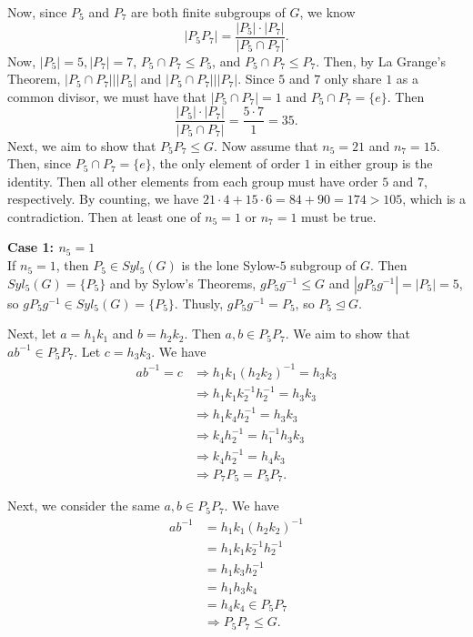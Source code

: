\documentclass{article}
\begin{document}
\begin{enumerate}
    Now, since $P_5$ and $P_7$ are both finite subgroups of $G$, we know
    \[
        |P_5P_7| = \dfrac{|P_5| \cdot |P_7|}{|P_5 \cap P_7|}.
    \]
    Now, $|P_5| = 5, |P_7|=7$, $P_5 \cap P_7 \leq P_5$, and $P_5 \cap P_7 \leq P_7$. Then, by La Grange's Theorem, $|P_5 \cap P_7| \big| |P_5|$
    and $|P_5 \cap P_7| \big| |P_7|$. Since $5$ and $7$ only share $1$ as a common divisor, we must have that $|P_5 \cap P_7| = 1$ and 
    $P_5 \cap P_7 = \{e\}$. Then 
    \[
        \dfrac{|P_5| \cdot |P_7|}{|P_5 \cap P_7|} = \dfrac{5 \cdot 7}{1} = 35.
    \]
    Next, we aim to show that $P_5P_7 \leq G$. Now assume that $n_5 = 21$ and $n_7 = 15$. Then, since $P_5 \cap P_7 = \{e\}$, the only element
    of order $1$ in either group is the identity. Then all other elements from each group must have order $5$ and $7$, respectively. By
    counting, we have $21 \cdot 4 + 15 \cdot 6 = 84 + 90 = 174 > 105$, which is a contradiction. Then at least one of $n_5 = 1$ or $n_7 = 1$
    must be true.

    \textbf{Case 1: $n_5 = 1$}\\
    If $n_5 = 1$, then $P_5 \in Syl_5(G)$ is the lone Sylow-$5$ subgroup of $G$. Then $Syl_5(G) = \{P_5\}$ and by Sylow's Theorems, 
    $gP_5g^{-1} \leq G$ and $|gP_5g^{-1}| = |P_5| = 5$, so $gP_5g^{-1} \in Syl_5(G) = \{P_5\}$. Thusly, $gP_5g^{-1} = P_5$, so $P_5 
    \trianglelefteq G$. 

    Next, let $a = h_1k_1$ and $b=h_2k_2$. Then $a,b \in P_5P_7$. We aim to show that $ab^{-1} \in P_5P_7$. Let $c = h_3k_3$. We have 
    \begin{align*}
        ab^{-1} = c &\Longrightarrow h_1k_1(h_2k_2)^{-1}=h_3k_3 \\
        &\Longrightarrow h_1k_1k_2^{-1}h_2^{-1}=h_3k_3 \\
        &\Longrightarrow h_1k_4h_2^{-1} = h_3k_3 \\
        &\Longrightarrow k_4h_2^{-1} = h_1^{-1}h_3k_3 \\
        &\Longrightarrow k_4h_2^{-1} = h_4k_3 \\
        &\Longrightarrow P_7P_5 = P_5P_7.
    \end{align*}

    Next, we consider the same $a,b \in P_5P_7$. We have
    \begin{align*}
        ab^{-1} &= h_1k_1(h_2k_2)^{-1} \\
        &= h_1k_1k_2^{-1}h_2^{-1} \\
        &= h_1k_3h_2^{-1} \\
        &= h_1h_3k_4 \\
        &= h_4k_4 \in P_5P_7 \\
        &\Longrightarrow P_5P_7 \leq G.
    \end{align*}


\end{enumerate}
\end{document}
